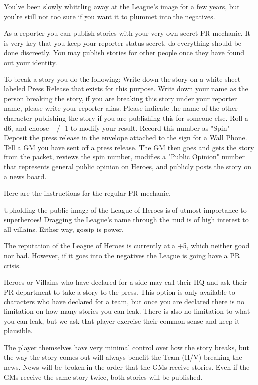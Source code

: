 \documentclass[green]{LRSguildcamp1}
\begin{document}
\name{\gNewspaperPR{}}

You've been slowly whittling away at the League's image for a few years, but you're still not too sure if you want it to plummet into the negatives. 

As a reporter you can publish stories with your very own secret PR mechanic. It is very key that you keep your reporter status secret, do everything should be done discreetly. You may publish stories for other people once they have found out your identity. 

To break a story you do the following:
Write down the story on a white sheet labeled Press Release that exists for this purpose. 
Write down your name as the person breaking the story, if you are breaking this story under your reporter name, please write your reporter alias. Please indicate the name of the other character publishing the story if you are publishing this for someone else. 
Roll a d6, and choose +/- 1 to modify your result. Record this number as "Spin"
Deposit the press release in the envelope attached to the sign for a Wall Phone. 
Tell a GM you have sent off a press release.
The GM then goes and gets the story from the packet, reviews the spin number, modifies a "Public Opinion" number that represents general public opinion on Heroes, and publicly posts the story on a news board. 

Here are the instructions for the regular PR mechanic. 

Upholding the public image of the League of Heroes is of utmost importance to superheroes! 
Dragging the League's name through the mud is of high interest to all villains. Either way, gossip is power. 

The reputation of the League of Heroes is currently at a +5, which neither good nor bad. However, if it goes into the negatives the League is going have a PR crisis. 

Heroes or Villains who have declared for a side may call their HQ and ask their PR department to take a story to the press. This option is only available to characters who have declared for a team, but once you are declared there is no limitation on how many stories you can leak. There is also no limitation to what you can leak, but we ask that player exercise their common sense and keep it plausible. 

The player themselves have very minimal control over how the story breaks, but the way the story comes out will always benefit the Team (H/V) breaking the news. News will be broken in the order that the GMs receive stories. Even if the GMs receive the same story twice, both stories will be published. 
\end{document}
